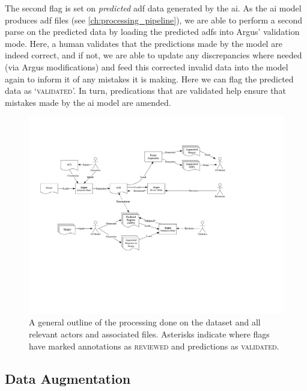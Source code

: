 The second flag is set on \textit{predicted} \gls{adf} data generated by the \gls{ai}. As the \gls{ai} model produces \gls{adf} files (see \cref{ch:processing_pipeline}), we are able to perform a second parse on the predicted data by loading the predicted \glspl{adf} into Argus' validation mode. Here, a human validates that the predictions made by the model are indeed correct, and if not, we are able to update any discrepancies where needed (via Argus modifications) and feed this corrected invalid data into the model again to inform it of any mistakes it is making. Here we can flag the predicted data as `\textsc{validated}'. In turn, predications that are validated help ensure that mistakes made by the \gls{ai} model are amended. 


\begin{landscape}
\begin{figure}[p]
  \centering
  \includegraphics[width=1.1\paperwidth]{images/dataset/overview}
  \caption[Overview of processing made on our dataset]{A general outline of the processing done on the dataset and all relevant actors and associated files. Asterisks indicate where flags have marked annotations as \textsc{reviewed} and predictions as \textsc{validated}.}
  \label{fig:dataset:postprocessing:overal_data_processing}
\end{figure}
\end{landscape}

\subsection{Data Augmentation}
\label{sec:dataset:postprocessing:augmentation}

